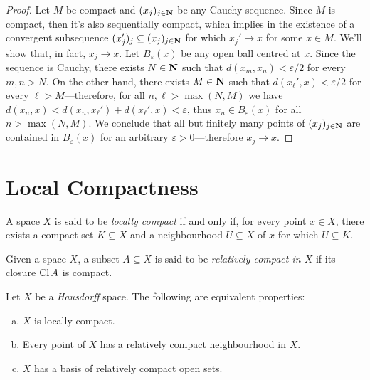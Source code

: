 \begin{proof}
    Let \(M\) be compact and \((x_j)_{j \in \mathbf{N}}\) be any Cauchy sequence. Since
    \(M\) is compact, then it's also sequentially compact, which implies in the
    existence of a convergent subsequence \((x_j')_j \subseteq (x_j)_{j \in \mathbf{N}}\)
    for which \(x_j' \to x\) for some \(x \in M\). We'll show that, in fact,
    \(x_j \to x\). Let \(B_{\varepsilon}(x)\) be any open ball centred at
    \(x\). Since the sequence is Cauchy, there exists \(N \in \mathbf{N}\) such that
    \(d(x_m, x_n) < \varepsilon/2\) for every \(m, n > N\). On the other hand, there
    exists \(M \in \mathbf{N}\) such that \(d(x_{\ell}', x) < \varepsilon/2\) for every
    \(\ell > M\)---therefore, for all \(n, \ell > \max(N, M)\) we have
    \(d(x_n, x) < d(x_n, x_{\ell}') + d(x_{\ell}', x) < \varepsilon\), thus
    \(x_n \in B_{\varepsilon}(x)\) for all \(n > \max(N, M)\). We conclude that all
    but finitely many points of \((x_j)_{j \in \mathbf{N}}\) are contained in
    \(B_{\varepsilon}(x)\) for an arbitrary \(\varepsilon > 0\)---therefore
    \(x_j \to x\).
\end{proof}

\section{Local Compactness}

\begin{definition}
    \label{def:locally-compact}
    A space \(X\) is said to be \emph{locally compact} if and only if, for every
    point \(x \in X\), there exists a compact set \(K \subseteq X\) and a
    neighbourhood \(U \subseteq X\) of \(x\) for which \(U \subseteq K\).
\end{definition}

\begin{definition}
    \label{def:relatively-compact}
    Given a space \(X\), a subset \(A \subseteq X\) is said to be \emph{relatively
        compact in \(X\)} if its closure \(\operatorname{Cl} A\) is compact.
\end{definition}

\begin{proposition}
    \label{prop:hausdorff-locally-and-relatively-compact}
    Let \(X\) be a \emph{Hausdorff} space. The following are equivalent properties:
    \begin{enumerate}[(a)]\setlength\itemsep{0em}
        \item \(X\) is locally compact.
        \item Every point of \(X\) has a relatively compact neighbourhood in \(X\).
        \item \(X\) has a basis of relatively compact open sets.
    \end{enumerate}
\end{proposition}

